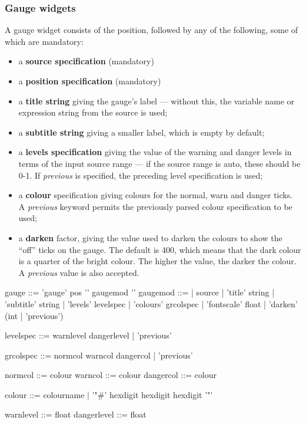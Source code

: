 \subsubsection{Gauge widgets}
A gauge widget consists of the position, followed by any of the following,
some of which are mandatory:
\begin{itemize}
\item a \textbf{source specification} (mandatory)
\item a \textbf{position specification} (mandatory)
\item a \textbf{title string} giving the gauge's label --- without this,
the variable name or expression string from the source is used;
\item a \textbf{subtitle string} giving a smaller label, which is empty
by default;
\item a \textbf{levels specification} giving the value of the warning
and danger levels in terms of the input source range --- if the source range is
auto, these should be 0-1. If \emph{previous} is specified, the preceding
level specification is used;
\item a \textbf{colour} specification giving colours for 
the normal, warn and danger ticks. A \emph{previous} keyword permits
the previously parsed colour specification to be used;
\item a \textbf{darken} factor, giving the value used to darken the colours
to show the ``off'' ticks on the gauge. The default is 400, which means that
the dark colour is a quarter of the bright colour. The higher the value, 
the darker the colour. A \emph{previous} value is also accepted.
\end{itemize}
\begin{v}
gauge       ::= 'gauge' pos '{' { gaugemod } '}'
gaugemod    ::=
            |   source
            |   'title' string
            |   'subtitle' string
            |   'levels' levelspec
            |   'colours' grcolspec
            |   'fontscale' float
            |   'darken' (int | 'previous')

levelspec   ::= warnlevel dangerlevel
            |   'previous'
            
grcolspec   ::= normcol warncol dangercol
            |   'previous'
            
normcol     ::= colour
warncol     ::= colour
dangercol   ::= colour

colour      ::= colourname
            |   '"#' hexdigit hexdigit hexdigit '"'

warnlevel   ::= float            
dangerlevel ::= float            
\end{v}


